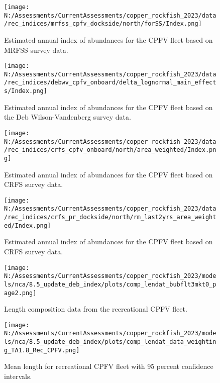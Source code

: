 \documentclass[11pt,
  english,
  letterpaper,
]{article}
\begin{document}
\begin{figure}
\centering
\texttt{[image: N:/Assessments/CurrentAssessments/copper\_rockfish\_2023/data/rec\_indices/mrfss\_cpfv\_dockside/north/forSS/Index.png]}
\caption{Estimated annual index of abundances for the CPFV fleet based on MRFSS survey data.\label{fig:mrfss-index-main}}
\end{figure}

\begin{figure}
\centering
\texttt{[image: N:/Assessments/CurrentAssessments/copper\_rockfish\_2023/data/rec\_indices/debwv\_cpfv\_onboard/delta\_lognormal\_main\_effects/Index.png]}
\caption{Estimated annual index of abundances for the CPFV fleet based on the Deb Wilson-Vandenberg survey data.\label{fig:dwv-index-main}}
\end{figure}

\begin{figure}
\centering
\texttt{[image: N:/Assessments/CurrentAssessments/copper\_rockfish\_2023/data/rec\_indices/crfs\_cpfv\_onboard/north/area\_weighted/Index.png]}
\caption{Estimated annual index of abundances for the CPFV fleet based on CRFS survey data.\label{fig:crfs-index-main}}
\end{figure}

\begin{figure}
\centering
\texttt{[image: N:/Assessments/CurrentAssessments/copper\_rockfish\_2023/data/rec\_indices/crfs\_pr\_dockside/north/rm\_last2yrs\_area\_weighted/Index.png]}
\caption{Estimated annual index of abundances for the CPFV fleet based on CRFS survey data.\label{fig:crfs-pr-index-main}}
\end{figure}

\begin{figure}
\centering
\texttt{[image: N:/Assessments/CurrentAssessments/copper\_rockfish\_2023/models/nca/8.5\_update\_deb\_index/plots/comp\_lendat\_bubflt3mkt0\_page2.png]}
\caption{Length composition data from the recreational CPFV fleet.\label{fig:rec-cpfv-len-data}}
\end{figure}

\begin{figure}
\centering
\texttt{[image: N:/Assessments/CurrentAssessments/copper\_rockfish\_2023/models/nca/8.5\_update\_deb\_index/plots/comp\_lendat\_data\_weighting\_TA1.8\_Rec\_CPFV.png]}
\caption{Mean length for recreational CPFV fleet with 95 percent confidence intervals.\label{fig:mean-rec-cpfv-len-data}}
\end{figure}
\end{document}

